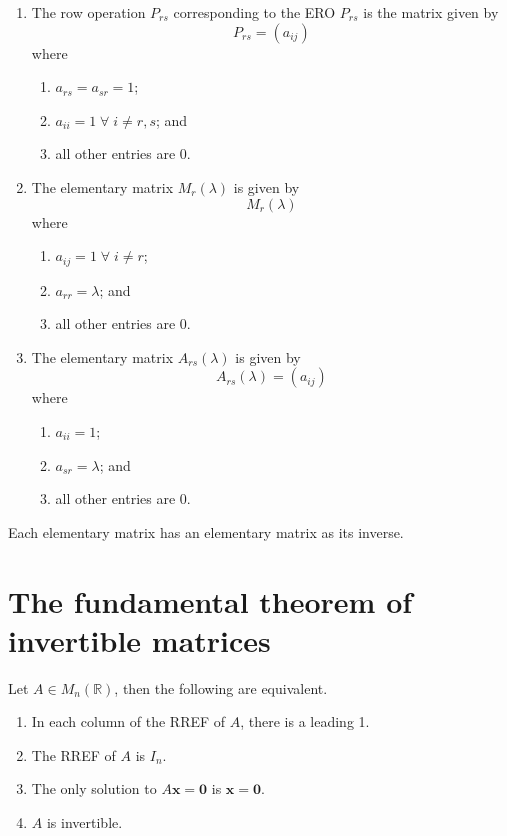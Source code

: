 \begin{enumerate}
    \item The row operation $P_{rs}$ corresponding to the ERO $P_{rs}$ is the matrix given by \[P_{rs}=(a_{ij})\] where
    \begin{enumerate}
        \item $a_{rs}=a_{sr}=1$;
        \item $a_{ii}=1\;\forall\;i\neq r,s$; and
        \item all other entries are $0$.
    \end{enumerate}
    
    \item The elementary matrix $M_r(\lambda)$ is given by \[M_r(\lambda)\] where
    \begin{enumerate}
        \item $a_{ij}=1\;\forall\;i\neq r$;
        \item $a_{rr}=\lambda$; and
        \item all other entries are $0$.
    \end{enumerate}
    
    \item The elementary matrix $A_{rs}(\lambda)$ is given by \[A_{rs}(\lambda)=(a_{ij})\] where
    \begin{enumerate}
        \item $a_{ii}=1$;
        \item $a_{sr}=\lambda$; and
        \item all other entries are $0$.
    \end{enumerate}
\end{enumerate}

\begin{remark}
    Each elementary matrix has an elementary matrix as its inverse.
\end{remark}

\section{The fundamental theorem of invertible matrices}

\begin{theorem}
    Let $A\in M_n(\mathbb R)$, then the following are equivalent.
    \begin{enumerate}
        \item In each column of the RREF of $A$, there is a leading 1.
        \item The RREF of $A$ is $I_n$.
        \item The only solution to $A\bm x=\bm 0$ is $\bm x=\bm 0$.
        \item $A$ is invertible.
    \end{enumerate}
\end{theorem}

